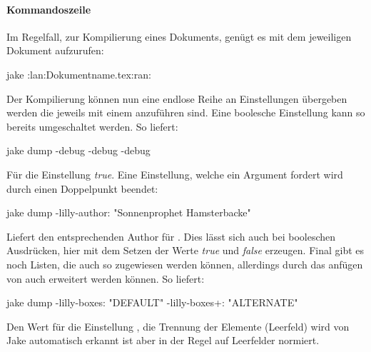 \paragraph{Kommandoszeile}
Im Regelfall, zur Kompilierung eines Dokuments, genügt es \Jake mit dem jeweiligen Dokument aufzurufen:
\begin{bash*}
jake :lan:Dokumentname.tex:ran:
\end{bash*}
Der Kompilierung können nun eine endlose Reihe an Einstellungen übergeben werden die jeweils mit einem \say{\T{-}} anzuführen sind. Eine boolesche Einstellung kann so bereits umgeschaltet werden. So liefert:
\begin{bash*}
jake dump -debug -debug -debug
\end{bash*}
Für die Einstellung  \emph{true}. Eine  Einstellung, welche ein Argument fordert wird durch einen Doppelpunkt beendet:
\begin{bash*}
jake dump -lilly-author: "Sonnenprophet Hamsterbacke"
\end{bash*}
Liefert den entsprechenden Author für . Dies lässt sich auch bei booleschen Ausdrücken, hier mit dem Setzen der Werte \emph{true} und \emph{false} erzeugen. Final gibt es noch Listen, die auch so zugewiesen werden können, allerdings durch das anfügen von \T{+:} auch erweitert werden können. So liefert:
\begin{bash*}
jake dump -lilly-boxes: "DEFAULT" -lilly-boxes+: "ALTERNATE"
\end{bash*}
Den Wert  für die Einstellung , die Trennung der Elemente (Leerfeld) wird von Jake automatisch erkannt ist aber in der Regel auf Leerfelder normiert.\\
